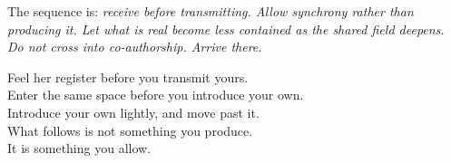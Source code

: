 \vspace{0.5em}
The sequence is: \textit{receive before transmitting. Allow synchrony 
rather than producing it. Let what is real become less contained 
as the shared field deepens. Do not cross into co-authorship. 
Arrive there.}

\begin{calloutbox}
Feel her register before you transmit yours.\\
Enter the same space before you introduce your own.\\
Introduce your own lightly, and move past it.\\[0.4em]
What follows is not something you produce.\\
It is something you allow.
\end{calloutbox}